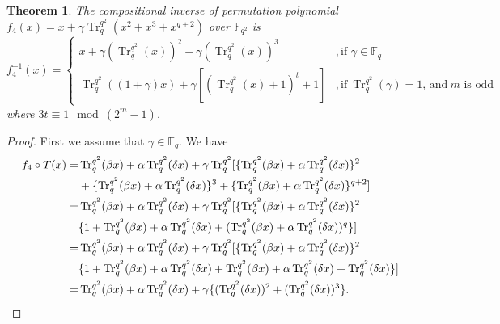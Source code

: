 \documentclass{birkjour}
\newtheorem{thm}{Theorem}[section]
\theoremstyle{definition}
\theoremstyle{remark}
\numberwithin{equation}{section}
\begin{document}
\begin{thm} The compositional inverse of permutation polynomial 
	$f_4(x)=x+\gamma\operatorname{Tr}_{q}^{q^2}(x^2+x^3+x^{q+2})$ over $\mathbb{F}_{q^2}$ is \\
	$f_4^{-1}(x)=\begin{cases}x+\gamma(\operatorname{Tr}_{q}^{q^2}(x))^2+\gamma(\operatorname{Tr}_{q}^{q^2}(x))^3&,\text{if } \gamma\in\mathbb{F}_q \\
	\operatorname{Tr}_{q}^{q^2}((1+\gamma)x)+\gamma[(\operatorname{Tr}_{q}^{q^2}(x)+1)^t+1]&, \text{if}~\operatorname{Tr}_{q}^{q^2}(\gamma)=1\text{, } \text{and}~ m \text{ is odd}
	\end{cases}$
	where $3t\equiv 1\mod{(2^m-1)}$.
\end{thm}
\begin{proof}
First we assume that $\gamma \in \mathbb{F}_{q}$.	
	We have
\begin{align}
	f_4\circ T(x)=&\operatorname{Tr}_{q}^{q^2}(\beta x)+\alpha\operatorname{Tr}_{q}^{q^2}(\delta x)+\gamma\operatorname{Tr}_{q}^{q^2}[\{\operatorname{Tr}_{q}^{q^2}(\beta x)+\alpha\operatorname{Tr}_{q}^{q^2}(\delta x)\}^2\notag\\&+\{\operatorname{Tr}_{q}^{q^2}(\beta x)+\alpha\operatorname{Tr}_{q}^{q^2}(\delta x)\}^3+\{\operatorname{Tr}_{q}^{q^2}(\beta x)+\alpha\operatorname{Tr}_{q}^{q^2}(\delta x)\}^{q+2}]\notag\\
	=&\operatorname{Tr}_{q}^{q^2}(\beta x)+\alpha\operatorname{Tr}_{q}^{q^2}(\delta x)+\gamma\operatorname{Tr}_{q}^{q^2}[\{\operatorname{Tr}_{q}^{q^2}(\beta x)+\alpha\operatorname{Tr}_{q}^{q^2}(\delta x)\}^2\notag\\&\{1+\operatorname{Tr}_{q}^{q^2}(\beta x)+\alpha\operatorname{Tr}_{q}^{q^2}(\delta x)+(\operatorname{Tr}_{q}^{q^2}(\beta x)+\alpha\operatorname{Tr}_{q}^{q^2}(\delta x))^q\}]\notag\\
	=&\operatorname{Tr}_{q}^{q^2}(\beta x)+\alpha\operatorname{Tr}_{q}^{q^2}(\delta x)+\gamma\operatorname{Tr}_{q}^{q^2}[\{\operatorname{Tr}_{q}^{q^2}(\beta x)+\alpha\operatorname{Tr}_{q}^{q^2}(\delta x)\}^2\notag\\&\{1+\operatorname{Tr}_{q}^{q^2}(\beta x)+\alpha\operatorname{Tr}_{q}^{q^2}(\delta x)+\operatorname{Tr}_{q}^{q^2}(\beta x)+\alpha\operatorname{Tr}_{q}^{q^2}(\delta x)+\operatorname{Tr}_{q}^{q^2}(\delta x)\}]\notag\\
	=&\operatorname{Tr}_{q}^{q^2}(\beta x)+\alpha\operatorname{Tr}_{q}^{q^2}(\delta x)+\gamma\{(\operatorname{Tr}_{q}^{q^2}(\delta x))^2+(\operatorname{Tr}_{q}^{q^2}(\delta x))^3\}.\label{4a}
\end{align}


\end{proof}
\end{document}
